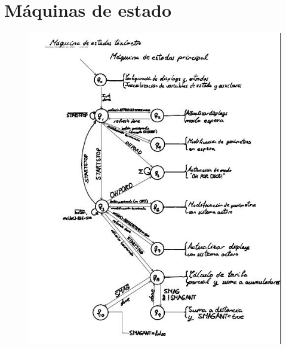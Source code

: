 \documentclass[a4paper,11pt]{article}
\begin{document}
\section*{Máquinas de estado}
\begin{figure}[h]
	\centering
	\includegraphics{images/maq1.jpg}
\end{figure}
\newpage
\end{document}
